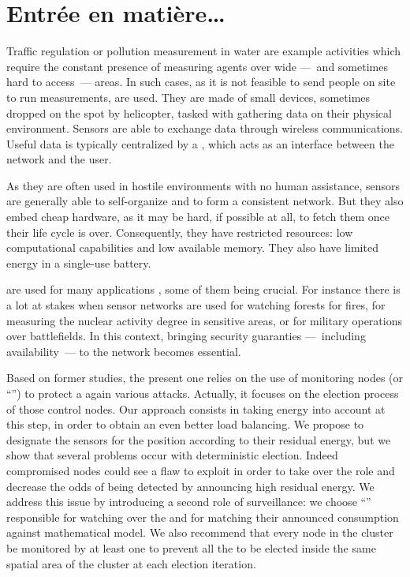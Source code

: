 \section{Entrée en matière…}
Traffic regulation or pollution measurement in water are example activities which require the constant presence of measuring agents over wide ---~and sometimes hard to access~--- areas.
In such cases, as it is not feasible to send people on site to run measurements, \wsns are used.
They are made of small devices, sometimes dropped on the spot by helicopter, tasked with gathering data on their physical environment.
Sensors are able to exchange data through wireless communications.
Useful data is typically centralized by a \bs, which acts as an interface between the network and the user.

As they are often used in hostile environments with no human assistance, sensors are generally able to self-organize and to form a consistent network.
But they also embed cheap hardware, as it may be hard, if possible at all, to fetch them once their life cycle is over.
Consequently, they have restricted resources: low computational capabilities and low available memory.
They also have limited energy%
in a single-use battery.

\Wsns are used for many applications%
, some of them being crucial.
For instance there is a lot at stakes when sensor networks are used for watching forests for fires, for measuring the nuclear activity degree in sensitive areas, or for military operations over battlefields.
In this context, bringing security guaranties ---~including availability~--- to the network becomes essential.

Based on former studies, the present one relies on the use of monitoring nodes (or ``\cns'') to protect a \wsn again various \dos attacks.
Actually, it focuses on the election process of those control nodes.
Our approach consists in taking energy into account at this step, in order to obtain an even better load balancing.
We propose to designate the sensors for the \cn position according to their residual energy, but we show that several problems occur with deterministic election.
Indeed compromised nodes could see a flaw to exploit in order to take over the \cn role and decrease the odds of being detected by announcing high residual energy.
We address this issue by introducing a second role of surveillance: we choose ``\vns'' responsible for watching over the \cns and for matching their announced consumption against mathematical model.
We also recommend that every node in the cluster be monitored by at least one \cn to prevent all the \cns to be elected inside the same spatial area of the cluster at each election iteration.
